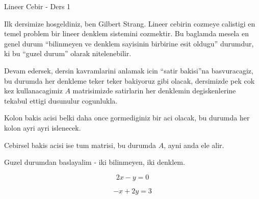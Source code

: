 \documentclass[12pt,fleqn]{article}\usepackage{../common}
\begin{document}
Lineer Cebir - Ders 1

Ilk dersimize hosgeldiniz, ben Gilbert Strang. Lineer cebirin cozmeye
calistigi en temel problem bir lineer denklem sistemini cozmektir. Bu
baglamda mesela en genel durum ``bilinmeyen ve denklem sayisinin birbirine
esit oldugu'' durumdur, ki bu ``guzel durum'' olarak nitelenebilir. 

Devam edersek, dersin kavramlarini anlamak icin ``satir bakisi''na
basvuracagiz, bu durumda her denkleme teker teker bakiyoruz gibi olacak,
dersimizde pek cok kez kullanacagimiz $A$ matrisimizde satirlarin her denklemin
degiskenlerine tekabul ettigi dusunulur cogunlukla. 

Kolon bakis acisi belki daha once gormediginiz bir aci olacak, bu durumda
her kolon ayri ayri islenecek. 

Cebirsel bakis acisi ise tum matrisi, bu durumda $A$, ayni anda ele alir. 

Guzel durumdan baslayalim - iki bilinmeyen, iki denklem.

$$ 2x - y = 0 $$

$$ -x + 2y = 3 $$
\end{document}
